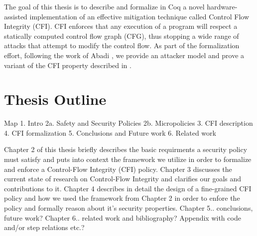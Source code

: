 The goal of this thesis is to describe and formalize in Coq a novel
hardware-assisted implementation of an effective mitigation technique called
Control Flow Integrity (CFI). CFI enforces that any execution of a program will
respect a statically computed control flow graph (CFG), thus stopping a wide
range of attacks that attempt to modify the control flow. As part of the
formalization effort, following the work of Abadi \ETAL \cite{abadi2005}, we 
provide an attacker model and prove a variant of the CFI property described in
\cite{abadi2005}.

\section{Thesis Outline}\label{sec:outline}
Map
1. Intro
2a. Safety and Security Policies
2b. Micropolicies
3. CFI description
4. CFI formalization
5. Conclusions and Future work
6. Related work

Chapter 2 of this thesis briefly describes the basic requirments a security
policy must satisfy and puts into context the framework we utilize in order
to formalize and enforce a Control-Flow Integrity (CFI) policy.
Chapter 3 discusses the current state of research on Control-Flow Integrity 
and clarifies our goals and contributions to it.
Chapter 4 describes in detail the design of a fine-grained CFI policy and
how we used the framework from Chapter 2 in order to enfore the policy
and formally reason about it's security properties.
Chapter 5.. conclusions, future work?
Chapter 6.. related work and bibliography?
Appendix with code and/or step relations etc.?
